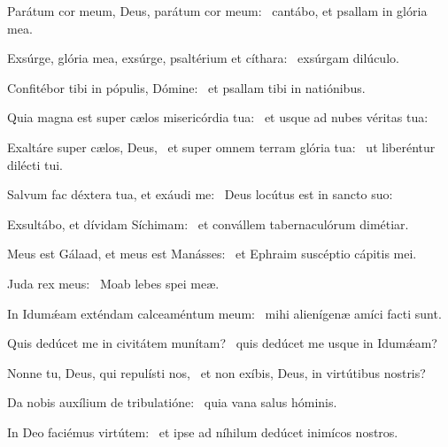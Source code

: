 \item Parátum cor meum, Deus, parátum cor meum:~\psstar{} cantábo, et psallam in glória mea.

\item Exsúrge, glória mea, exsúrge, psaltérium et cíthara:~\psstar{} exsúrgam dilúculo.

\item Confitébor tibi in pópulis, Dómine:~\psstar{} et psallam tibi in natiónibus.

\item Quia magna est super cælos misericórdia tua:~\psstar{} et usque ad nubes véritas tua:

\item Exaltáre super cælos, Deus,~\pscross{} et super omnem terram glória tua:~\psstar{} ut liberéntur dilécti tui.

\item Salvum fac déxtera tua, et exáudi me:~\psstar{} Deus locútus est in sancto suo:

\item Exsultábo, et dívidam Síchimam:~\psstar{} et convállem tabernaculórum dimétiar.

\item Meus est Gálaad, et meus est Manásses:~\psstar{} et Ephraim suscéptio cápitis mei.

\item Juda rex meus:~\psstar{} Moab lebes spei meæ.

\item In Idumǽam exténdam calceaméntum meum:~\psstar{} mihi alienígenæ amíci facti sunt.

\item Quis dedúcet me in civitátem munítam?~\psstar{} quis dedúcet me usque in Idumǽam?

\item Nonne tu, Deus, qui repulísti nos,~\psstar{} et non exíbis, Deus, in virtútibus nostris?

\item Da nobis auxílium de tribulatióne:~\psstar{} quia vana salus hóminis.

\item In Deo faciémus virtútem:~\psstar{} et ipse ad níhilum dedúcet inimícos nostros.
